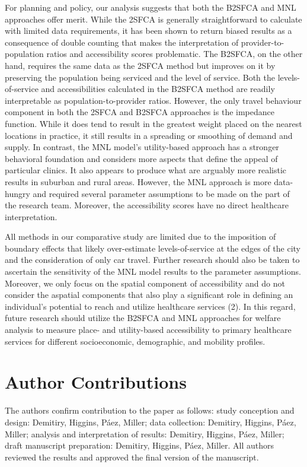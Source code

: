 \documentclass{article}
\begin{document}
For planning and policy, our analysis suggests that both the B2SFCA and
MNL approaches offer merit. While the 2SFCA is generally straightforward
to calculate with limited data requirements, it has been shown to return
biased results as a consequence of double counting that makes the
interpretation of provider-to-population ratios and accessibility scores
problematic. The B2SFCA, on the other hand, requires the same data as
the 2SFCA method but improves on it by preserving the population being
serviced and the level of service. Both the levels-of-service and
accessibilities calculated in the B2SFCA method are readily
interpretable as population-to-provider ratios. However, the only travel
behaviour component in both the 2SFCA and B2SFCA approaches is the
impedance function. While it does tend to result in the greatest weight
placed on the nearest locations in practice, it still results in a
spreading or smoothing of demand and supply. In contrast, the MNL
model's utility-based approach has a stronger behavioral foundation and
considers more aspects that define the appeal of particular clinics. It
also appears to produce what are arguably more realistic results in
suburban and rural areas. However, the MNL approach is more data-hungry
and required several parameter assumptions to be made on the part of the
research team. Moreover, the accessibility scores have no direct
healthcare interpretation.

All methods in our comparative study are limited due to the imposition
of boundary effects that likely over-estimate levels-of-service at the
edges of the city and the consideration of only car travel. Further
research should also be taken to ascertain the sensitivity of the MNL
model results to the parameter assumptions. Moreover, we only focus on
the spatial component of accessibility and do not consider the aspatial
components that also play a significant role in defining an individual's
potential to reach and utilize healthcare services (2). In this regard,
future research should utilize the B2SFCA and MNL approaches for welfare
analysis to measure place- and utility-based accessibility to primary
healthcare services for different socioeconomic, demographic, and
mobility profiles.

\hypertarget{author-contributions}{%
\section{Author Contributions}\label{author-contributions}}

The authors confirm contribution to the paper as follows: study
conception and design: Demitiry, Higgins, Páez, Miller; data collection:
Demitiry, Higgins, Páez, Miller; analysis and interpretation of results:
Demitiry, Higgins, Páez, Miller; draft manuscript preparation: Demitiry,
Higgins, Páez, Miller. All authors reviewed the results and approved the
final version of the manuscript.
\end{document}
